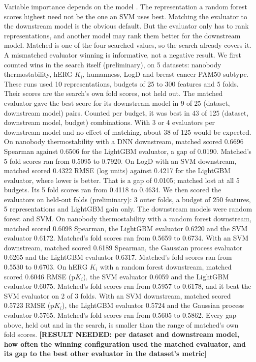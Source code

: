 Variable importance depends on the model \citep{Dong2020}. The representation a random forest scores highest need not be the one an SVM uses best. Matching the evaluator to the downstream model is the obvious default. But the evaluator only has to rank representations, and another model may rank them better for the downstream model. Matched is one of the four searched values, so the search already covers it. A mismatched evaluator winning is informative, not a negative result. We first counted wins in the search itself (preliminary), on 5 datasets: nanobody thermostability, hERG $K_i$, humanness, LogD and breast cancer PAM50 subtype. These runs used 10 representations, budgets of 25 to 300 features and 5 folds. Their scores are the search's own fold scores, not held out. The matched evaluator gave the best score for its downstream model in 9 of 25 (dataset, downstream model) pairs. Counted per budget, it was best in 43 of 125 (dataset, downstream model, budget) combinations. With 3 or 4 evaluators per downstream model and no effect of matching, about 38 of 125 would be expected. On nanobody thermostability with a DNN downstream, matched scored 0.6696 Spearman against 0.6506 for the LightGBM evaluator, a gap of 0.0190. Matched's 5 fold scores ran from 0.5095 to 0.7920. On LogD with an SVM downstream, matched scored 0.4322 RMSE (log units) against 0.4217 for the LightGBM evaluator, where lower is better. That is a gap of 0.0105; matched lost at all 5 budgets. Its 5 fold scores ran from 0.4118 to 0.4634. We then scored the evaluators on held-out folds (preliminary): 3 outer folds, a budget of 250 features, 5 representations and LightGBM gain only. The downstream models were random forest and SVM. On nanobody thermostability with a random forest downstream, matched scored 0.6098 Spearman, the LightGBM evaluator 0.6220 and the SVM evaluator 0.6172. Matched's fold scores ran from 0.5659 to 0.6734. With an SVM downstream, matched scored 0.6189 Spearman, the Gaussian process evaluator 0.6265 and the LightGBM evaluator 0.6317. Matched's fold scores ran from 0.5530 to 0.6703. On hERG $K_i$ with a random forest downstream, matched scored 0.6046 RMSE (p$K_i$), the SVM evaluator 0.6059 and the LightGBM evaluator 0.6075. Matched's fold scores ran from 0.5957 to 0.6178, and it beat the SVM evaluator on 2 of 3 folds. With an SVM downstream, matched scored 0.5723 RMSE (p$K_i$), the LightGBM evaluator 0.5724 and the Gaussian process evaluator 0.5765. Matched's fold scores ran from 0.5605 to 0.5862. Every gap above, held out and in the search, is smaller than the range of matched's own fold scores. \textbf{[RESULT NEEDED: per dataset and downstream model, how often the winning configuration used the matched evaluator, and its gap to the best other evaluator in the dataset's metric]}


